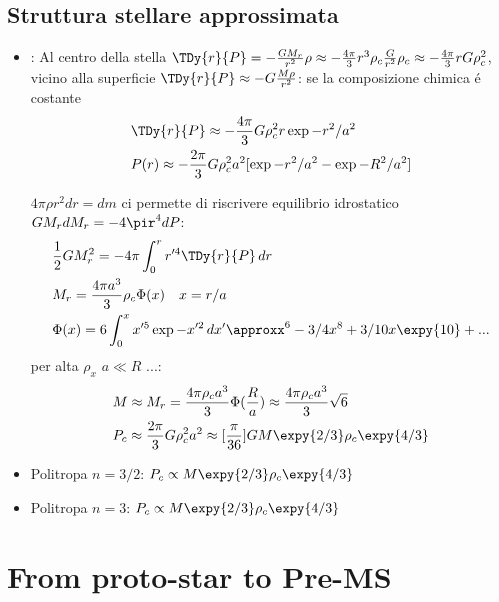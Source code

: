 \subsection{Struttura stellare approssimata}

\begin{itemize}
\item {}:
Al centro della stella $\TDy{r}{P}=-\frac{GM_r}{r^2}\rho\approx-\frac{4\pi}{3}r^3\rho_c\frac{G}{r^2}\rho_c\approx-\frac{4\pi}{3}rG\rho_c^2$, vicino alla superficie $\TDy{r}{P}\approx-G\frac{M\rho}{r^2}$: se la composizione chimica \'e costante
\begin{align*}
&\TDy{r}{P}\approx-\frac{4\pi}{3}G\rho_c^2r\exp{-r^2/a^2}\\
&P(r)\approx-\frac{2\pi}{3}G\rho_c^2a^2[\exp{-r^2/a^2}-\exp{-R^2/a^2}]
\end{align*}

$4\pi\rho r^2dr=dm$ ci permette di riscrivere equilibrio idrostatico $GM_rdM_r=-4\pir^4dP$:
\begin{align*}
&\frac{1}{2}GM_r^2=-4\pi\int_0^rr'^4\TDy{r}{P}\,dr\\
&M_r=\frac{4\pi a^3}{3}\rho_c\Phi(x)\quad x=r/a\\
&\Phi(x)=6\int_0^xx'^5\exp{-x'^2}\,dx'\approxx^6-3/4x^8+3/10x\expy{10}+...
\end{align*}
per alta $\rho_x$ $a\ll R$ ...:
\begin{align*}
&M\approx M_r=\frac{4\pi\rho_ca^3}{3}\Phi(\frac{R}{a})\approx\frac{4\pi\rho_ca^3}{3}\sqrt{6}\\
&P_c\approx\frac{2\pi}{3}G\rho_c^2a^2\approx[\frac{\pi}{36}]GM\expy{2/3}\rho_c\expy{4/3}
\end{align*}

\item Politropa $n=3/2$: $P_c\propto M\expy{2/3}\rho_c\expy{4/3}$

\item Politropa $n=3$: $P_c\propto M\expy{2/3}\rho_c\expy{4/3}$

\end{itemize}



\section{From proto-star to Pre-MS}

